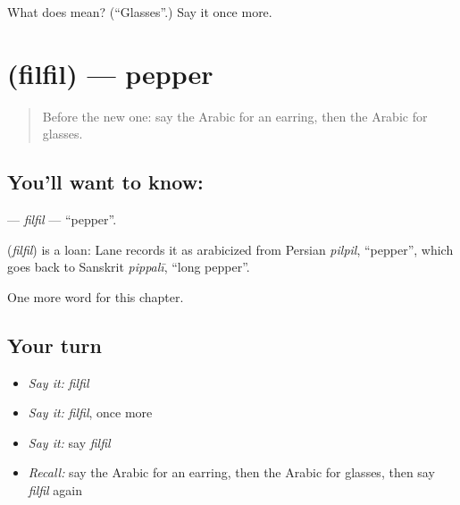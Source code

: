 \begin{tcolorbox}[breakable,colback=teal!4,colframe=teal!35!black,title={Before you move on}]
What does  mean? (\textquotedblleft{}Glasses\textquotedblright{}.) Say it once more.
\end{tcolorbox}
\section[\texorpdfstring{\ar{فلفل} (filfil)}{فلفل (filfil)}]{ (filfil) — pepper}

\label{lesson:AR-C128-filfil}



\begin{quote}
Before the new one: say the Arabic for an earring, then the Arabic for glasses.
\end{quote}

\subsection*{You'll want to know: }
\textbf{} — \emph{filfil} — \textquotedblleft{}pepper\textquotedblright{}.

\begin{cousinweb}
\textbf{} (\emph{filfil}) is a loan: Lane records it as arabicized from Persian \emph{pilpil}, \textquotedblleft{}pepper\textquotedblright{}, which goes back to Sanskrit \emph{pippalī}, \textquotedblleft{}long pepper\textquotedblright{}.
\end{cousinweb}

\begin{grammarlens}[title={What you've built}]
One more word for this chapter.
\end{grammarlens}

\subsection*{Your turn}
\begin{itemize}
\raggedright
  \item \emph{Say it:} \emph{filfil}
  \item \emph{Say it:} \emph{filfil}, once more
  \item \emph{Say it:} say \emph{filfil}
  \item \emph{Recall:} say the Arabic for an earring, then the Arabic for glasses, then say \emph{filfil} again
\end{itemize}

